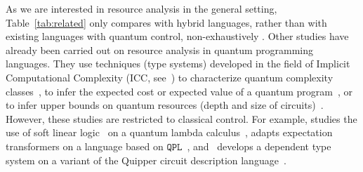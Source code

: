 As we are interested in resource analysis in the general setting,
Table~\ref{tab:related} only compares \hyrql{} with hybrid languages, rather
than with existing languages with quantum control, non-exhaustively
\cite{SVV18,DCM22,Yin24,YVC24}.
Other studies have already been carried out on resource analysis in quantum
programming languages. They use techniques (\eg type systems) developed in the
field of Implicit Computational Complexity (ICC, see~\cite{Pec20}) to
characterize quantum complexity classes~\cite{DLMZ10}, to infer the expected
cost or expected value of a quantum program~\cite{AMPPZ22}, or to infer upper
bounds on quantum resources (depth and size of circuits)~\cite{CDL25}. However,
these studies are restricted to classical control. For example, \cite{DLMZ10}
studies the use of soft linear logic~\cite{L04} on a quantum lambda
calculus~\cite{SV05}, \cite{AMPPZ22} adapts expectation transformers on a
language based on $\texttt{QPL}$~\cite{Sel04}, and~\cite{CDL25} develops a
dependent type system on a variant of the Quipper circuit description
language~\cite{GLRSV13}.

